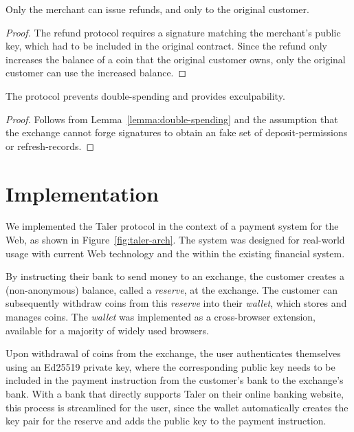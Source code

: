 \documentclass[sigconf, authordraft]{acmart}
\begin{document}
\begin{lemma}
Only the merchant can issue refunds, and only to the original customer.
\end{lemma}

\begin{proof}
The refund protocol requires a signature matching the merchant's public
key, which had to be included in the original contract.
Since the refund only increases the balance of a coin that the original
customer owns, only the original customer can use the increased balance.
\end{proof}


\begin{theorem}
  The protocol prevents double-spending and provides exculpability.
\end{theorem}
\begin{proof}
  Follows from Lemma~\ref{lemma:double-spending} and the assumption
  that the exchange cannot forge signatures to obtain an fake
  set of deposit-permissions or refresh-records.
\end{proof}



\section{Implementation}
We implemented the Taler protocol in the context of a payment system for the
Web, as shown in Figure~\ref{fig:taler-arch}.  The system was designed for real-world usage with
current Web technology and the within the existing financial system.

By instructing their bank to send money to an exchange, the customer creates a
(non-anonymous) balance, called a \emph{reserve}, at the exchange.  The
customer can subsequently withdraw coins from this \emph{reserve} into their
\emph{wallet}, which stores and manages coins.  The \emph{wallet} was
implemented as a cross-browser extension, available for a majority of widely
used browsers.

Upon withdrawal of coins from the exchange, the user authenticates themselves
using an Ed25519 private key, where the corresponding public key needs to be
included in the payment instruction from the customer's bank to the exchange's
bank.  With a bank that directly supports Taler on their online banking website,
this process is streamlined for the user, since the wallet automatically
creates the key pair for the reserve and adds the public key to the
payment instruction.
\end{document}
